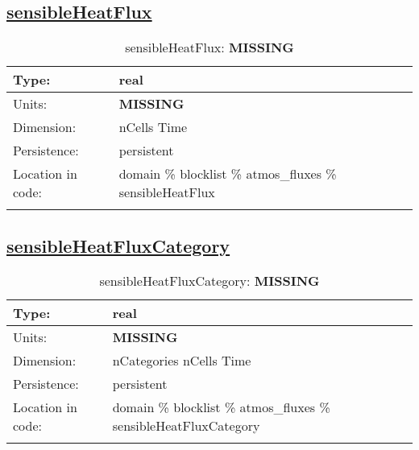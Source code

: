 \subsection[sensibleHeatFlux]{\hyperref[sec:var_tab_atmos_fluxes]{sensibleHeatFlux}}
\label{subsec:var_sec_atmos_fluxes_sensibleHeatFlux}
\begin{center}
\begin{longtable}{| p{2.0in} | p{4.0in} |}
        \hline 
        Type: & real \\
        \hline 
        Units: & {\bf \color{red} MISSING} \\
        \hline 
        Dimension: & nCells Time \\
        \hline 
        Persistence: & persistent \\
        \hline 
         Location in code: & domain \% blocklist \% atmos\_fluxes \% sensibleHeatFlux \\
         \hline 
    \caption{sensibleHeatFlux: {\bf \color{red} MISSING}}
\end{longtable}
\end{center}
\subsection[sensibleHeatFluxCategory]{\hyperref[sec:var_tab_atmos_fluxes]{sensibleHeatFluxCategory}}
\label{subsec:var_sec_atmos_fluxes_sensibleHeatFluxCategory}
\begin{center}
\begin{longtable}{| p{2.0in} | p{4.0in} |}
        \hline 
        Type: & real \\
        \hline 
        Units: & {\bf \color{red} MISSING} \\
        \hline 
        Dimension: & nCategories nCells Time \\
        \hline 
        Persistence: & persistent \\
        \hline 
         Location in code: & domain \% blocklist \% atmos\_fluxes \% sensibleHeatFluxCategory \\
         \hline 
    \caption{sensibleHeatFluxCategory: {\bf \color{red} MISSING}}
\end{longtable}
\end{center}
